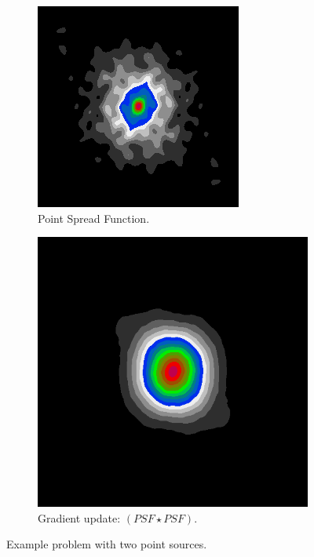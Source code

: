 \begin{figure}[!h]
	\centering
	\begin{subfigure}[b]{0.3\linewidth}
		\includegraphics[width=\linewidth]{./chapters/03.distribution/simulated/psf.png}
		\caption{Point Spread Function.}
		\label{cd:efficient:update:dirty}
	\end{subfigure}
	\begin{subfigure}[b]{0.3\linewidth}
		\includegraphics[width=\linewidth]{./chapters/03.distribution/simulated/psf2.png}
		\caption{Gradient update: $(PSF \star PSF)$.}
		\label{cd:efficient:update:psf}
	\end{subfigure}
	\caption{Example problem with two point sources.}
	\label{cd:efficient:update:figure}
\end{figure}

